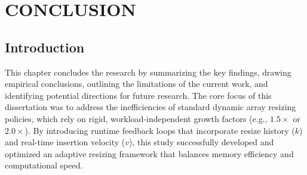 \chapter{CONCLUSION}

\section{Introduction}
This chapter concludes the research by summarizing the key findings, drawing 
empirical conclusions, outlining the limitations of the current work, and 
identifying potential directions for future research. The core focus of this 
dissertation was to address the inefficiencies of standard dynamic array 
resizing policies, which rely on rigid, workload-independent growth factors 
(e.g., $1.5\times$ or $2.0\times$). By introducing runtime feedback loops that 
incorporate resize history ($k$) and real-time insertion velocity ($v$), this 
study successfully developed and optimized an adaptive resizing framework that 
balances memory efficiency and computational speed.

